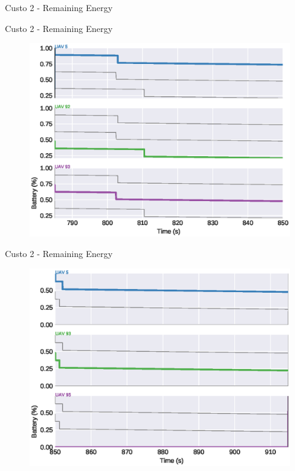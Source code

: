 \begin{frame}{Custo 2 - Remaining Energy}
\begin{figure}[!htb]
                    \end{figure}
                \end{frame}\begin{frame}{Custo 2 - Remaining Energy}
                    \begin{figure}[!htb]
                        \includegraphics[width=\textwidth]{custo_2/uav_remaining_energy_850.eps}
                    \end{figure}
                \end{frame}\begin{frame}{Custo 2 - Remaining Energy}
                    \begin{figure}[!htb]
                        \includegraphics[width=\textwidth]{custo_2/uav_remaining_energy_915.eps}

\end{figure}
\end{frame}
